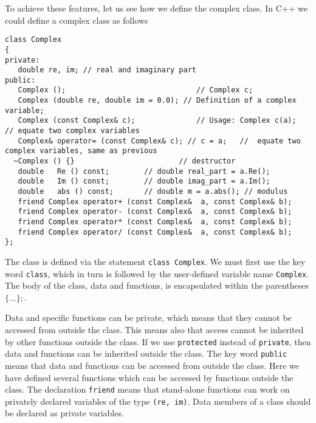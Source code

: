 To achieve these features, let us see how we  define the complex class.
In C++ we could define a complex class as follows
\begin{lstlisting}
class Complex
{
private:
   double re, im; // real and imaginary part
public:
   Complex ();                              // Complex c;
   Complex (double re, double im = 0.0); // Definition of a complex variable;
   Complex (const Complex& c);              // Usage: Complex c(a);   // equate two complex variables
   Complex& operator= (const Complex& c); // c = a;   //  equate two complex variables, same as previous
  ~Complex () {}                        // destructor
   double   Re () const;        // double real_part = a.Re();
   double   Im () const;        // double imag_part = a.Im();
   double   abs () const;       // double m = a.abs(); // modulus
   friend Complex operator+ (const Complex&  a, const Complex& b);
   friend Complex operator- (const Complex&  a, const Complex& b);
   friend Complex operator* (const Complex&  a, const Complex& b);
   friend Complex operator/ (const Complex&  a, const Complex& b);
};
\end{lstlisting}

The class is defined via the statement \verb?class Complex?. We must first use the key word 
\verb?class?, which in turn is followed by the user-defined variable name  \verb?Complex?. 
The body of the class, data and functions, is encapsulated  within the parentheses $\{...\};$.

Data and specific functions can be private, which means that they cannot be accessed from outside the class.
This means also that access cannot be inherited by other functions outside the class. If we use \verb?protected?
instead of \verb?private?, then data and functions can be inherited outside the class.
The key word \verb?public? means  that data and functions can be accessed from outside the class.
Here we have defined several functions  which can be accessed by functions outside the class.
The declaration \verb?friend? means that stand-alone functions can work on privately declared  variables  of the type
\verb?(re, im)?.  Data members of a class should be declared as private variables.


